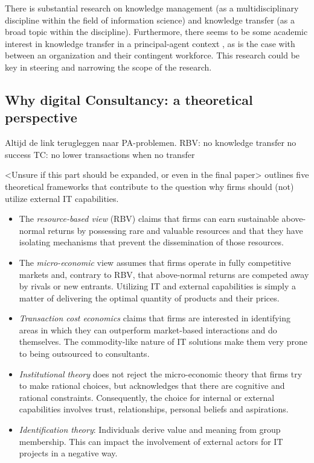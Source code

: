 \documentclass[12pt]{article}
\providecommand{\tightlist}{%
  \setlength{\itemsep}{0pt}\setlength{\parskip}{0pt}}
\begin{document}
There is substantial research on knowledge management (as a
multidisciplinary discipline within the field of information science)
and knowledge transfer (as a broad topic within the discipline).
Furthermore, there seems to be some academic interest in knowledge
transfer in a principal-agent context \citep{ning2008, haines2003}, as
is the case with between an organization and their contingent workforce.
This research could be key in steering and narrowing the scope of the
research.

\hypertarget{why-digital-consultancy-a-theoretical-perspective}{%
\subsection{Why digital Consultancy: a theoretical
perspective}\label{why-digital-consultancy-a-theoretical-perspective}}

Altijd de link terugleggen naar PA-problemen. RBV: no knowledge transfer
no success TC: no lower transactions when no transfer

\textless Unsure if this part should be expanded, or even in the final
paper\textgreater{} \citet[8-10]{nevo2007} outlines five theoretical
frameworks that contribute to the question why firms should (not)
utilize external IT capabilities.

\begin{itemize}
\tightlist
\item
  The \emph{resource-based view} (RBV) claims that firms can earn
  sustainable above-normal returns by possessing rare and valuable
  resources and that they have isolating mechanisms that prevent the
  dissemination of those resources.
\item
  The \emph{micro-economic} view assumes that firms operate in fully
  competitive markets and, contrary to RBV, that above-normal returns
  are competed away by rivals or new entrants. Utilizing IT and external
  capabilities is simply a matter of delivering the optimal quantity of
  products and their prices.
\item
  \emph{Transaction cost economics} claims that firms are interested in
  identifying areas in which they can outperform market-based
  interactions and do themselves. The commodity-like nature of IT
  solutions make them very prone to being outsourced to consultants.
\item
  \emph{Institutional theory} does not reject the micro-economic theory
  that firms try to make rational choices, but acknowledges that there
  are cognitive and rational constraints. Consequently, the choice for
  internal or external capabilities involves trust, relationships,
  personal beliefs and aspirations.
\item
  \emph{Identification theory}: Individuals derive value and meaning
  from group membership. This can impact the involvement of external
  actors for IT projects in a negative way.
\end{itemize}
\end{document}
